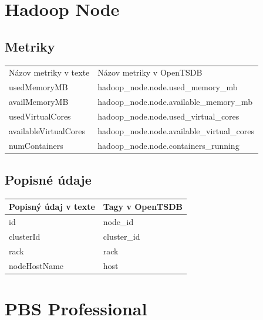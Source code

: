 \documentclass[printed,11pt,twoside,color,cover,table]{fithesis3}
\begin{document}
\begin{appendices}
\section{Hadoop Node}
\subsection{Metriky}
\begin{center}
    \begin{tabular}{| l | l |}
    \hline
    Názov metriky v texte & Názov metriky v OpenTSDB\\
	usedMemoryMB & hadoop\_node.node.used\_memory\_mb\\ \hline
    availMemoryMB & hadoop\_node.node.available\_memory\_mb\\ \hline
    usedVirtualCores & hadoop\_node.node.used\_virtual\_cores\\ \hline
    availableVirtualCores & hadoop\_node.node.available\_virtual\_cores\\ \hline 
    numContainers & hadoop\_node.node.containers\_running\\ \hline
    \end{tabular}
\end{center}

\subsection{Popisné údaje}
\begin{center}
    \begin{tabular}{| l | l |}
    \hline
    Popisný údaj v texte & Tagy v OpenTSDB \\ \hline
    id & node\_id\\ \hline
    clusterId & cluster\_id\\ \hline
    rack & rack\\ \hline
    nodeHostName & host\\ \hline
    \end{tabular}
\end{center}

\section{PBS Professional}


\end{appendices}
\end{document}
